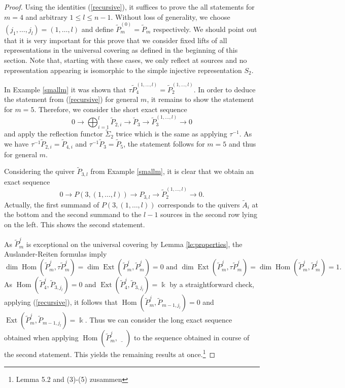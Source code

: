 \documentclass{amsart}
\newcommand{\uj}{\underline j}
\newcommand{\kk}{\Bbbk}
\newcommand{\Ext}{\operatorname{Ext}}
\newcommand{\Hom}{\operatorname{Hom}}
\newcommand{\ses}[3]{0\rightarrow #1\rightarrow #2\rightarrow#3\rightarrow 0}
\begin{document}
\begin{proof}
Using the identities (\ref{recursive}), it suffices to prove the all statements for $m=4$ and arbitrary $1\leq l\leq n-1$. Without loss of generality, we choose $(j_1,\ldots,j_l)=(1,\ldots,l)$ and define $\tilde P_m^{(0)}=\tilde P_m$ respectively. We should point out that it is very important for this prove that we consider fixed lifts of all representations in the universal covering as defined in the beginning of this section. Note that, starting with these cases, we only reflect at sources and no representation appearing is isomorphic to the simple injective representation $S_2$.  


In Example \ref{smallm} it was shown that $\tau \tilde P_4^{(1,\ldots,l)}=\tilde P_2^{(1,\ldots,l)}$. In order to deduce the statement from (\ref{recursive}) for general $m$, it remains to show the statement for $m=5$. Therefore, we consider the short exact sequence
\[\ses{\bigoplus_{i=1}^l\tilde P_{2,i}}{\tilde P_3}{\tilde P_3^{(1,\ldots,l)}}\]
and apply the reflection functor $\tilde\Sigma_2$ twice which is the same as applying $\tau^{-1}$. As we have $\tau^{-1} \tilde P_{2,i}=\tilde P_{4,i}$ and $\tau^{-1}\tilde P_3=\tilde P_5$, the statement follows for $m=5$ and thus for general $m$.

Considering the quiver $\tilde P_{3,l}$ from Example \ref{smallm}, it is clear that we obtain an exact sequence
$$\ses{P(3,(1,\ldots,l))}{P_{3,l}}{\tilde P_2^{(1,\ldots,l)}}.$$
Actually, the first summand of $P(3,(1,\ldots,l))$ corresponds to the quivers $\tilde A_i$ at the bottom and the second summand to the $l-1$ sources in the second row lying on the left. This shows the second statement.

As $\tilde P_m^{\uj}$ is exceptional on the universal covering by Lemma \ref{le:properties}, the Auslander-Reiten formulas \cite[Theorem IV.2.13]{ass} imply 
$$\dim\Hom(\tilde P_{m}^{\uj},\tau \tilde P_{m}^{\uj})=\dim\Ext(\tilde P_{m}^{\uj},\tilde P_{m}^{\uj})=0 \text{ and } \dim\Ext(\tilde P_m^{\uj},\tau\tilde P_m^{j})=\dim\Hom(\tilde P_{m}^{\uj},\tilde P_{m}^{\uj})=1.$$
As $\Hom(\tilde P_{4}^{\uj},\tilde P_{3,j_l})=0$ and $\Ext(\tilde P_{4}^{\uj},\tilde P_{3,j_l})=\kk$ by a straightforward check, applying (\ref{recursive}), it follows that $\Hom(\tilde P_{m}^{\uj},\tilde P_{m-1,j_l})=0$ and $\Ext(\tilde P_{m}^{\uj},\tilde P_{m-1,j_l})=\kk$. Thus we can consider the long exact sequence obtained when applying $\Hom(\tilde P_{m}^{\uj},\underline{\quad})$ to the sequence obtained in course of the second statement. This yields the remaining results at once.\footnote{Lemma 5.2 and (3)-(5) zusammen}




\end{proof}
\end{document}
